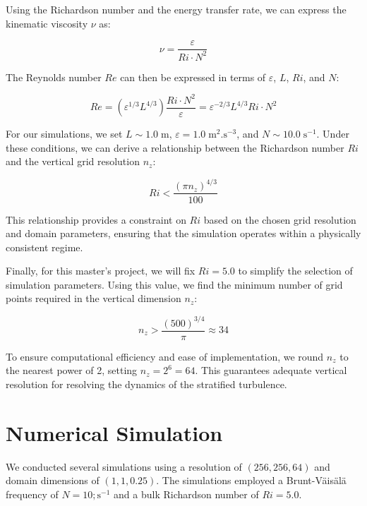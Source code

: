\documentclass[final,5p,times,twocolumn,authoryear]{elsarticle}
\begin{document}
Using the Richardson number and the energy transfer rate, we can express the kinematic viscosity $\nu$ as:

\begin{equation*}
\nu = \frac{\varepsilon}{Ri \cdot N^2}
\end{equation*}

The Reynolds number $Re$ can then be expressed in terms of $\varepsilon$, $L$, $Ri$, and $N$:

\begin{equation}
Re = \left(\varepsilon^{1/3} L^{4/3} \right) \frac{Ri \cdot N^2}{\varepsilon} = \varepsilon^{-2/3} L^{4/3} Ri \cdot N^2
\end{equation}

For our simulations, we set $L \sim 1.0 \; \mathrm{m}$, $\varepsilon = 1.0 \; \mathrm{m^2.s^{-3}}$, and $N \sim 10.0 \; \mathrm{s^{-1}}$. Under these conditions, we can derive a relationship between the Richardson number $Ri$ and the vertical grid resolution $n_z$:

\begin{equation}
Ri < \frac{\left(\pi n_z\right)^{4/3}}{100}
\end{equation}

This relationship provides a constraint on $Ri$ based on the chosen grid resolution and domain parameters, ensuring that the simulation operates within a physically consistent regime.

Finally, for this master’s project, we will fix $Ri = 5.0$ to simplify the selection of simulation parameters. Using this value, we find the minimum number of grid points required in the vertical dimension $n_z$:

\begin{equation*}
n_z > \frac{\left(500\right)^{3/4}}{\pi} \approx 34
\end{equation*}

To ensure computational efficiency and ease of implementation, we round $n_z$ to the nearest power of 2, setting $n_z = 2^6 = 64$. This guarantees adequate vertical resolution for resolving the dynamics of the stratified turbulence.

\section{Numerical Simulation}

We conducted several simulations using a resolution of $(256, 256, 64)$ and domain dimensions of $(1, 1, 0.25)$. The simulations employed a Brunt-Väisälä frequency of $N = 10 ; \mathrm{s^{-1}}$ and a bulk Richardson number of $Ri = 5.0$.
\end{document}
